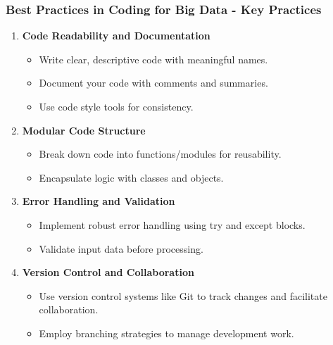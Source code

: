 \documentclass[aspectratio=169]{beamer}
\begin{document}
\begin{frame}[fragile]
    \frametitle{Best Practices in Coding for Big Data - Key Practices}
    \begin{enumerate}
        \item \textbf{Code Readability and Documentation}
        \begin{itemize}
            \item Write clear, descriptive code with meaningful names. 
            \item Document your code with comments and summaries.
            \item Use code style tools for consistency.
        \end{itemize}

        \item \textbf{Modular Code Structure}
        \begin{itemize}
            \item Break down code into functions/modules for reusability.
            \item Encapsulate logic with classes and objects.
        \end{itemize}

        \item \textbf{Error Handling and Validation}
        \begin{itemize}
            \item Implement robust error handling using try and except blocks.
            \item Validate input data before processing.
        \end{itemize}

        \item \textbf{Version Control and Collaboration}
        \begin{itemize}
            \item Use version control systems like Git to track changes and facilitate collaboration.
            \item Employ branching strategies to manage development work.
        \end{itemize}
    \end{enumerate}
\end{frame}
\end{document}
